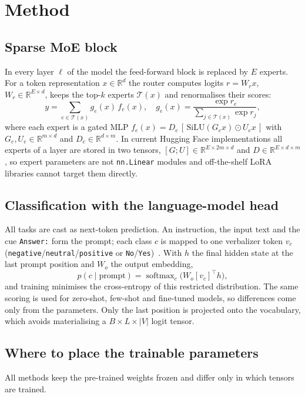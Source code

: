\section{Method}

\subsection{Sparse MoE block}
In every layer $\ell$ of the model the feed-forward block is replaced by $E$ experts. For a token
representation $x\in\mathbb{R}^{d}$ the router computes logits $r = W_r x$, $W_r\in\mathbb{R}^{E\times d}$,
keeps the top-$k$ experts $\mathcal{T}(x)$ and renormalises their scores:
\begin{equation}
  y = \sum_{e\in\mathcal{T}(x)} g_e(x)\, f_e(x),\quad
  g_e(x) = \frac{\exp r_e}{\sum_{j\in\mathcal{T}(x)} \exp r_j},
\end{equation}
where each expert is a gated MLP $f_e(x) = D_e\,[\,\mathrm{SiLU}(G_e x)\odot U_e x\,]$ with
$G_e,U_e\in\mathbb{R}^{m\times d}$ and $D_e\in\mathbb{R}^{d\times m}$. In current Hugging Face
implementations all experts of a layer are stored in two tensors,
$[G;U]\in\mathbb{R}^{E\times 2m\times d}$ and $D\in\mathbb{R}^{E\times d\times m}$, so expert
parameters are not \texttt{nn.Linear} modules and off-the-shelf LoRA libraries cannot target
them directly.

\subsection{Classification with the language-model head}
All tasks are cast as next-token prediction. An instruction, the input text and the cue
\texttt{Answer:} form the prompt; each class $c$ is mapped to one verbalizer token
$v_c$ (\texttt{negative}/\texttt{neutral}/\texttt{positive} or \texttt{No}/\texttt{Yes})~\cite{schick2021pet}.
With $h$ the final hidden state at the last prompt position and $W_o$ the output embedding,
\begin{equation}
  p(c\mid \text{prompt}) = \operatorname{softmax}_{c}\big( W_o[v_c]^{\top} h \big),
\end{equation}
and training minimises the cross-entropy of this restricted distribution. The same scoring is
used for zero-shot, few-shot and fine-tuned models, so differences come only from the
parameters. Only the last position is projected onto the vocabulary, which avoids
materialising a $B\times L\times|V|$ logit tensor.

\subsection{Where to place the trainable parameters}
All methods keep the pre-trained weights frozen and differ only in which tensors are trained.

